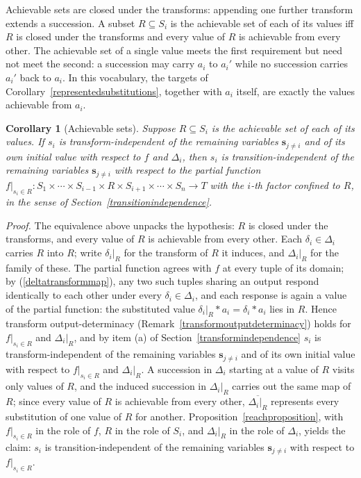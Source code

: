 \documentclass{article}
\newtheorem{corollary}[proposition]{Corollary}
\theoremstyle{definition}
\theoremstyle{remark}
\begin{document}
\noindent Achievable sets are closed under the transforms: appending one further transform extends a succession. A subset $R \subseteq S_i$ is the achievable set of each of its values iff $R$ is closed under the transforms and every value of $R$ is achievable from every other. The achievable set of a single value meets the first requirement but need not meet the second: a succession may carry $a_i$ to $a_i'$ while no succession carries $a_i'$ back to $a_i$. In this vocabulary, the targets of Corollary~\ref{representedsubstitutions}, together with $a_i$ itself, are exactly the values achievable from $a_i$.

\begin{corollary}[Achievable sets]
\label{achievablesets}
Suppose $R \subseteq S_i$ is the achievable set of each of its values. If $s_i$ is transform-independent of the remaining variables $\boldsymbol{s}_{j \neq i}$ and of its own initial value with respect to $f$ and $\Delta_i$, then $s_i$ is transition-independent of the remaining variables $\boldsymbol{s}_{j \neq i}$ with respect to the partial function $f|_{s_i \in R} \colon S_1 \times \cdots \times S_{i-1} \times R \times S_{i+1} \times \cdots \times S_n \to T$ with the $i$-th factor confined to $R$, in the sense of Section~\ref{transitionindependence}.
\end{corollary}

\noindent \textit{Proof.} The equivalence above unpacks the hypothesis: $R$ is closed under the transforms, and every value of $R$ is achievable from every other. Each $\delta_i \in \Delta_i$ carries $R$ into $R$; write $\delta_i|_R$ for the transform of $R$ it induces, and $\Delta_i|_R$ for the family of these. The partial function agrees with $f$ at every tuple of its domain; by (\ref{deltatransformmap}), any two such tuples sharing an output respond identically to each other under every $\delta_i \in \Delta_i$, and each response is again a value of the partial function: the substituted value $\delta_i|_R \ast a_i = \delta_i \ast a_i$ lies in $R$. Hence transform output-determinacy (Remark~\ref{transformoutputdeterminacy}) holds for $f|_{s_i \in R}$ and $\Delta_i|_R$, and by item (a) of Section~\ref{transformindependence} $s_i$ is transform-independent of the remaining variables $\boldsymbol{s}_{j \neq i}$ and of its own initial value with respect to $f|_{s_i \in R}$ and $\Delta_i|_R$. A succession in $\Delta_i$ starting at a value of $R$ visits only values of $R$, and the induced succession in $\Delta_i|_R$ carries out the same map of $R$; since every value of $R$ is achievable from every other, $\overline{\Delta_i|_R}$ represents every substitution of one value of $R$ for another. Proposition~\ref{reachproposition}, with $f|_{s_i \in R}$ in the role of $f$, $R$ in the role of $S_i$, and $\Delta_i|_R$ in the role of $\Delta_i$, yields the claim: $s_i$ is transition-independent of the remaining variables $\boldsymbol{s}_{j \neq i}$ with respect to $f|_{s_i \in R}$.
\end{document}

